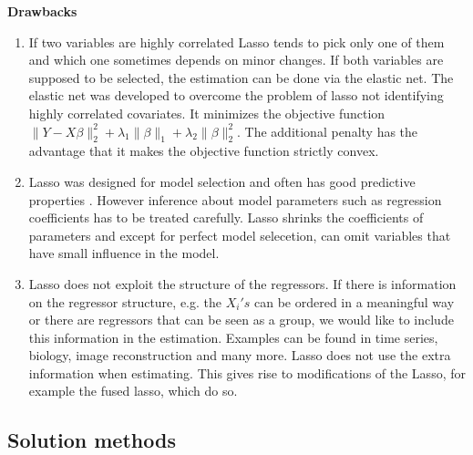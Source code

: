 \documentclass{article}
\theoremstyle{definition}
\begin{document}
\noindent\textbf{Drawbacks}
\begin{enumerate}
	\item If two variables are highly correlated Lasso tends to pick only one of them and which one sometimes depends on minor changes.  If both variables are supposed to be selected, the estimation can be done via the elastic net. The elastic net was developed to overcome the problem of lasso not identifying highly correlated covariates. It minimizes the objective function $\| Y-X\beta\|_2^2+\lambda_1 \| \beta\|_1 +\lambda_2\|\beta\|_2^2$. The additional penalty has the advantage that it makes the objective function strictly convex.
	\item Lasso was designed for model selection and often has good predictive properties \citep{belloni2014}. However inference about model parameters such as regression coefficients has to be treated carefully. Lasso shrinks the coefficients of parameters and except for perfect model selecetion, can omit variables that have small influence in the model.
	\item Lasso does not exploit the structure of the regressors. If there is information on the regressor structure, e.g. the $X_i's$ can be ordered in a meaningful way or there are regressors that can be seen as a group, we would like to include this information in the estimation. Examples can be found in time series, biology, image reconstruction and many more.
	Lasso does not use the extra information when estimating. This gives rise to modifications of the Lasso, for example the fused lasso, which do so. 
\end{enumerate}

\subsection{Solution methods}
\end{document}
